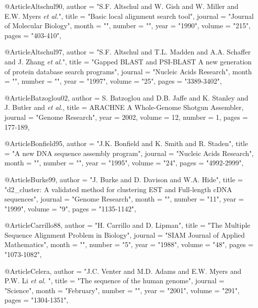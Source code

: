 @Article{Altschul90,
   author =   "S.F. Altschul and W. Gish and W. Miller and E.W. Myers {\it et al.}",
   title =   "Basic local alignment search tool",
   journal =   "Journal of Molecular Biology",
   month = "",
   number = "",
   year =   "1990",
   volume =   "215",
   pages =   "403-410",
}

@Article{Altschul97,
   author =   "S.F. Altschul and T.L. Madden and A.A. Schaffer and J. Zhang {\it et al.}",
   title =   "Gapped \uppercase{BLAST} and \uppercase{PSI-BLAST} A new
              generation of protein database search programs",
   journal =   "Nucleic Acids Research",
   month = "",
   number = "",
   year =   "1997",
   volume =   "25",
   pages =   "3389-3402",
}


@Article{Batzoglou02,
  author =              {S. Batzoglou and D.B. Jaffe and K. Stanley and J. Butler and {\it et al.}},
  title =               {{ARACHNE} A Whole-Genome Shotgun Assembler},
  journal =     "Genome Research",
  year =                        {2002},
  volume =              {12},
  number =              {1},
  pages =                       {177-189},
}


@Article{Bonfield95,
   author =   "J.K. Bonfield and K. Smith and R. Staden",
   title =   "A new \uppercase{DNA} sequence assembly program",
   journal =   "Nucleic Acids Research",
   month = "",
   number = "",
   year =   "1995",
   volume =   "24",
   pages =   "4992-2999",
}


@Article{Burke99,
   author =   "J. Burke and D. Davison and W.A. Hide",
   title =   "d2\_cluster: \uppercase{A} validated method for clustering \uppercase{EST} and Full-length c\uppercase{DNA} sequences",
   journal =   "Genome Research",
   month = "",
   number = "11",
   year =   "1999",
   volume =   "9",
   pages =   "1135-1142",
}




@Article{Carrillo88,
   author =   "H. Carrillo and D. Lipman",
   title =   "The Multiple Sequence Alignment Problem in Biology",
   journal =   "SIAM Journal of Applied Mathematics",
   month = "",
   number = "5",
   year =   "1988",
   volume =   "48",
   pages =   "1073-1082",
}


@Article{Celera,
   author =   "J.C. Venter and M.D. Adams and E.W. Myers and P.W. Li {\it et al.} ",
   title =   "The sequence of the human genome",
   journal =   "Science",
   month = "February",
   number = "",
   year =   "2001",
   volume =   "291",
   pages =   "1304-1351",
}






